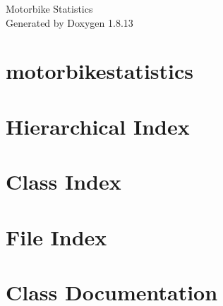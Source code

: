 \documentclass[twoside]{book}
\newcommand{\+}{\discretionary{\mbox{\scriptsize$\hookleftarrow$}}{}{}}
\newcommand{\clearemptydoublepage}{%
  \newpage{\pagestyle{empty}\cleardoublepage}%
}
\begin{document}
\hypersetup{pageanchor=false,
             bookmarksnumbered=true,
             pdfencoding=unicode
            }
\begin{titlepage}
\vspace*{7cm}
\begin{center}%
{\Large Motorbike Statistics }\\
\vspace*{1cm}
{\large Generated by Doxygen 1.8.13}\\
\end{center}
\end{titlepage}
\clearemptydoublepage
{}
\tableofcontents
\clearemptydoublepage
{}
\hypersetup{pageanchor=true}

\chapter{motorbikestatistics}
\label{index}\hypertarget{index}{}
\chapter{Hierarchical Index}

\chapter{Class Index}

\chapter{File Index}

\chapter{Class Documentation}


















\end{document}
